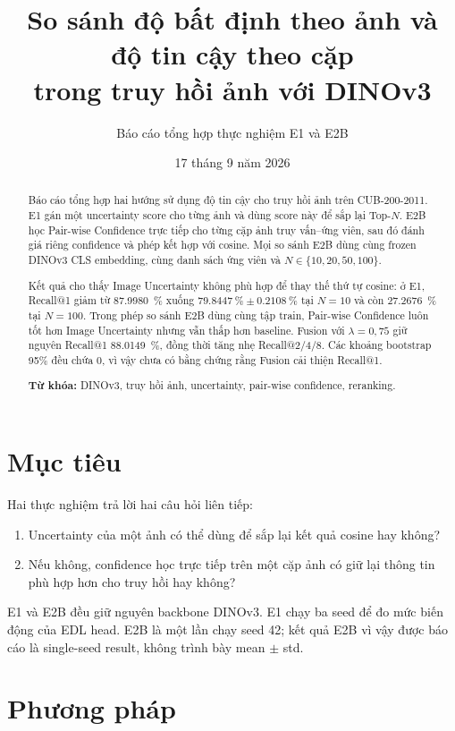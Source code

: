 \documentclass[11pt,a4paper]{article}
\title{\bfseries\LARGE So sánh độ bất định theo ảnh và độ tin cậy theo cặp\\[0.3em]
trong truy hồi ảnh với DINOv3}
\author{Báo cáo tổng hợp thực nghiệm E1 và E2B}
\date{17 tháng 9 năm 2026}
\begin{document}
\maketitle
\thispagestyle{plain}

\begin{abstract}
Báo cáo tổng hợp hai hướng sử dụng độ tin cậy cho truy hồi ảnh trên
CUB-200-2011. E1 gán một uncertainty score cho từng ảnh và dùng score này để
sắp lại Top-$N$. E2B học Pair-wise Confidence trực tiếp cho từng cặp ảnh truy
vấn--ứng viên, sau đó đánh giá riêng confidence và phép kết hợp với cosine.
Mọi so sánh E2B dùng cùng frozen DINOv3 CLS embedding, cùng danh sách ứng viên
và $N\in\{10,20,50,100\}$.

Kết quả cho thấy Image Uncertainty không phù hợp để thay thế thứ tự cosine:
ở E1, Recall@1 giảm từ \SI{87.9980}{\percent} xuống
$\SI{79.8447}{\percent}\pm\SI{0.2108}{\percent}$ tại $N=10$ và còn
\SI{27.2676}{\percent} tại $N=100$. Trong phép so sánh E2B dùng cùng tập train,
Pair-wise Confidence luôn tốt hơn Image Uncertainty nhưng vẫn thấp hơn
baseline. Fusion với $\lambda=0{,}75$ giữ nguyên Recall@1
\SI{88.0149}{\percent}, đồng thời tăng nhẹ Recall@2/4/8. Các khoảng bootstrap
95\% đều chứa 0, vì vậy chưa có bằng chứng rằng Fusion cải thiện Recall@1.

\textbf{Từ khóa:} DINOv3, truy hồi ảnh, uncertainty, pair-wise confidence,
reranking.
\end{abstract}

\section{Mục tiêu}
Hai thực nghiệm trả lời hai câu hỏi liên tiếp:
\begin{enumerate}
  \item Uncertainty của một ảnh có thể dùng để sắp lại kết quả cosine hay không?
  \item Nếu không, confidence học trực tiếp trên một cặp ảnh có giữ lại thông
  tin phù hợp hơn cho truy hồi hay không?
\end{enumerate}

E1 và E2B đều giữ nguyên backbone DINOv3. E1 chạy ba seed để đo mức biến động
của EDL head. E2B là một lần chạy seed 42; kết quả E2B vì vậy được báo cáo là
single-seed result, không trình bày mean $\pm$ std.

\section{Phương pháp}
\end{document}
